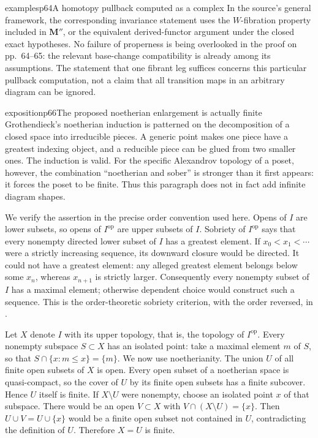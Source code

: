 \begin{dcomment}{examples}{p64}{A homotopy pullback computed as a complex}
In the source's general framework, the corresponding invariance statement uses the $W$-fibration property included in $\mathbf M''$, or the equivalent derived-functor argument under the closed exact hypotheses. No failure of properness is being overlooked in the proof on pp.~64--65: the relevant base-change compatibility is already among its assumptions. The statement that one fibrant leg suffices concerns this particular pullback computation, not a claim that all transition maps in an arbitrary diagram can be ignored.
\end{dcomment}

\begin{dcomment}{exposition}{p66}{The proposed noetherian enlargement is actually finite}
Grothendieck's noetherian induction is patterned on the decomposition of a closed space into irreducible pieces. A generic point makes one piece have a greatest indexing object, and a reducible piece can be glued from two smaller ones. The induction is valid. For the specific Alexandrov topology of a poset, however, the combination ``noetherian and sober'' is stronger than it first appears: it forces the poset to be finite. Thus this paragraph does not in fact add infinite diagram shapes.

We verify the assertion in the precise order convention used here. Opens of $I$ are lower subsets, so opens of $I^{\mathrm{op}}$ are upper subsets of $I$. Sobriety of $I^{\mathrm{op}}$ says that every nonempty directed lower subset of $I$ has a greatest element. If $x_0<x_1<\cdots$ were a strictly increasing sequence, its downward closure would be directed. It could not have a greatest element: any alleged greatest element belongs below some $x_n$, whereas $x_{n+1}$ is strictly larger. Consequently every nonempty subset of $I$ has a maximal element; otherwise dependent choice would construct such a sequence. This is the order-theoretic sobriety criterion, with the order reversed, in \citet[Proposition B.5]{Lindenhovius2014}.

Let $X$ denote $I$ with its upper topology, that is, the topology of $I^{\mathrm{op}}$. Every nonempty subspace $S\subset X$ has an isolated point: take a maximal element $m$ of $S$, so that $S\cap\{x:m\leq x\}=\{m\}$. We now use noetherianity. The union $U$ of all finite open subsets of $X$ is open. Every open subset of a noetherian space is quasi-compact, so the cover of $U$ by its finite open subsets has a finite subcover. Hence $U$ itself is finite. If $X\setminus U$ were nonempty, choose an isolated point $x$ of that subspace. There would be an open $V\subset X$ with $V\cap(X\setminus U)=\{x\}$. Then $U\cup V=U\cup\{x\}$ would be a finite open subset not contained in $U$, contradicting the definition of $U$. Therefore $X=U$ is finite.


\end{dcomment}
